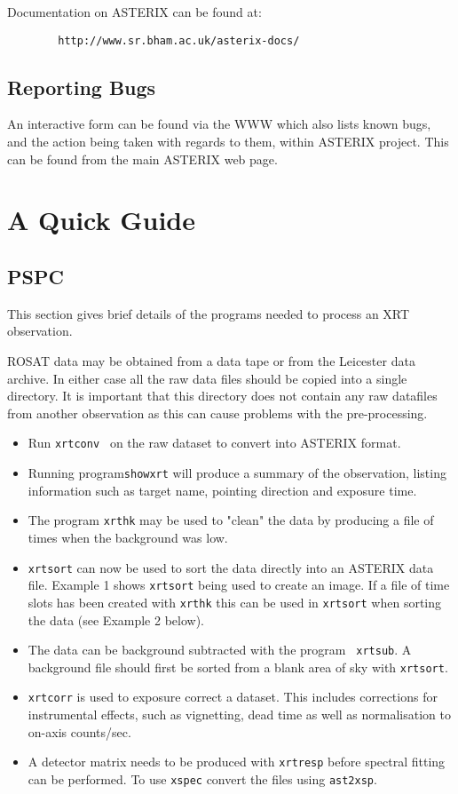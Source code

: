 \documentclass[11pt,fleqn]{article}    %
\begin{document}
Documentation on ASTERIX can be found at:

\begin{verbatim}
        http://www.sr.bham.ac.uk/asterix-docs/
\end{verbatim}


\subsection{Reporting Bugs}
An interactive form can be found via the WWW which also lists known bugs,
and the action being taken with regards to them, within ASTERIX project.
This can be found from the main ASTERIX web page.

\newpage
\section{A Quick Guide}

\subsection{PSPC}

This section gives brief details of the programs needed to process an
XRT observation.

ROSAT data may be obtained from a data tape or from the Leicester data
archive. In either case all the raw data files should be copied into
a single directory. It is important that this directory does not
contain any raw datafiles from another observation as this can cause
problems with the pre-processing.

\begin{itemize}
\item{Run {\tt xrtconv } on the raw dataset to convert into ASTERIX format.}
\item{Running program{\tt showxrt} will produce a summary of the observation, listing
information such as target name, pointing direction and exposure time.}
\item{The program {\tt xrthk} may be used to "clean" the data by
producing a file of times when the background was low.}
\item{{\tt xrtsort} can now be used to sort the data directly into an
ASTERIX data file.  Example 1 shows {\tt xrtsort} being used to create an
image.  If a file of time slots has been created with {\tt xrthk} this
can be used in {\tt xrtsort} when sorting the data (see Example 2 below).}
\item{The data can be background subtracted with the program {\tt
xrtsub}.  A background file should first be sorted from a blank area
of sky with {\tt xrtsort}.}
\item{{\tt xrtcorr} is used to exposure correct a dataset.  This
includes corrections for instrumental effects, such as vignetting,
dead time as well as normalisation to on-axis counts/sec.}
\item{A detector matrix needs to be produced with {\tt xrtresp} before
spectral fitting can be performed.  To use {\tt xspec} convert the
files using {\tt ast2xsp}.}
\end{itemize}
\end{document}
